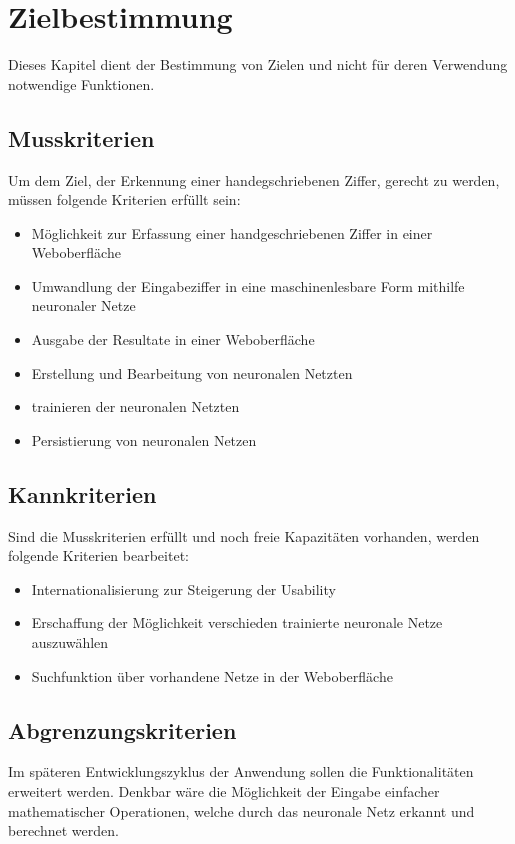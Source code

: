 \chapter{Zielbestimmung}
Dieses Kapitel dient der Bestimmung von Zielen und nicht für deren Verwendung
notwendige Funktionen.
 
\section{Musskriterien}

Um dem Ziel, der Erkennung einer handegschriebenen Ziffer, gerecht zu werden, müssen 
folgende Kriterien erfüllt sein:

\begin{itemize}
\item Möglichkeit zur Erfassung einer handgeschriebenen Ziffer in einer Weboberfläche
\item Umwandlung der Eingabeziffer in eine maschinenlesbare Form mithilfe neuronaler Netze
\item Ausgabe der Resultate in einer Weboberfläche
\item Erstellung und Bearbeitung von neuronalen Netzten
\item trainieren der neuronalen Netzten
\item Persistierung von neuronalen Netzen
\end{itemize}
 
\section{Kannkriterien}

Sind die Musskriterien erfüllt und noch freie Kapazitäten vorhanden, werden folgende Kriterien bearbeitet:

\begin{itemize}
\item Internationalisierung zur Steigerung der Usability
\item Erschaffung der Möglichkeit verschieden trainierte neuronale Netze auszuwählen
\item Suchfunktion über vorhandene Netze in der Weboberfläche
\end{itemize}

 
\section{Abgrenzungskriterien}
Im späteren Entwicklungszyklus der Anwendung sollen die Funktionalitäten erweitert werden. Denkbar wäre die Möglichkeit
der Eingabe einfacher mathematischer Operationen, welche durch das neuronale Netz erkannt und berechnet werden.
